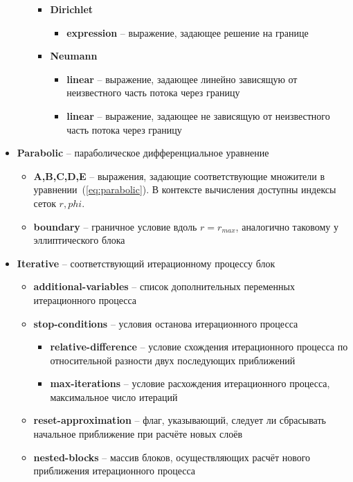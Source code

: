 \begin{itemize}
\begin{itemize}
\begin{itemize}
            \item \textbf{Dirichlet}
            \begin{itemize}
                \item \textbf{expression} -- выражение, задающее решение на 
                границе
            \end{itemize}
            \item \textbf{Neumann}
            \begin{itemize}
                \item \textbf{linear} -- выражение, задающее линейно зависящую 
                от неизвестного часть потока через границу
                \item \textbf{linear} -- выражение, задающее не зависящую 
                от неизвестного часть потока через границу
            \end{itemize}
        \end{itemize}
    \end{itemize}
    \item \textbf{Parabolic} -- параболическое дифференциальное уравнение
    \begin{itemize}
        \item \textbf{A,B,C,D,E} -- выражения, задающие соответствующие 
        множители 
        в уравнении~(\ref{eq:parabolic}). В контексте вычисления доступны 
        индексы сеток $r, phi$.
        \item \textbf{boundary} -- граничное условие вдоль $r=r_{max}$, 
        аналогично таковому у эллиптического блока
    \end{itemize}
    \item \textbf{Iterative} -- соответствующий итерационному процессу блок
    \begin{itemize}
        \item \textbf{additional-variables} -- список дополнительных переменных 
        итерационного процесса
        \item \textbf{stop-conditions} -- условия останова итерационного 
        процесса
        \begin{itemize}
            \item \textbf{relative-difference} -- условие схождения 
            итерационного процесса по относительной разности двух последующих 
            приближений
            \item \textbf{max-iterations} -- условие расхождения итерационного 
            процесса, максимальное число итераций
        \end{itemize}
        \item \textbf{reset-approximation} -- флаг, указывающий, следует ли 
        сбрасывать начальное приближение при расчёте новых слоёв
        \item \textbf{nested-blocks} -- массив блоков, осуществляющих расчёт 
        нового приближения итерационного процесса
    \end{itemize}
\end{itemize}

